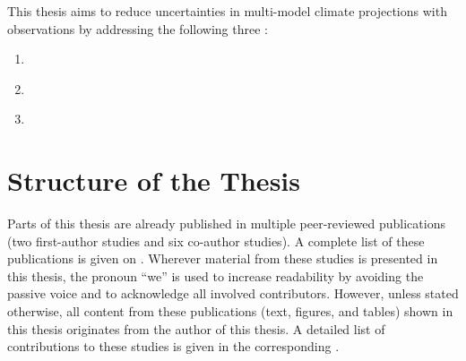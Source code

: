 This thesis aims to reduce uncertainties in multi-model climate projections
with observations by addressing the following three
:

\begingroup
{}
\begin{enumerate}
  \item \label{enum:01:question_1} \KeyScienceQuestionOne{}
  \item \label{enum:01:question_2} \KeyScienceQuestionTwo{}
  \item \label{enum:01:question_3} \KeyScienceQuestionThree{}
\end{enumerate}
\endgroup


\section{Structure of the Thesis}
\label{sec:01:structure}

Parts of this thesis are already published in multiple peer-reviewed
publications (two first-author studies and six co-author studies). A complete
list of these publications is given on . Wherever material
from these studies is presented in this thesis, the pronoun \enquote{we} is
used to increase readability by avoiding the passive voice and to acknowledge
all involved contributors. However, unless stated otherwise, all content from
these publications (text, figures, and tables) shown in this thesis originates
from the author of this thesis. A detailed list of contributions to these
studies is given in the corresponding .

